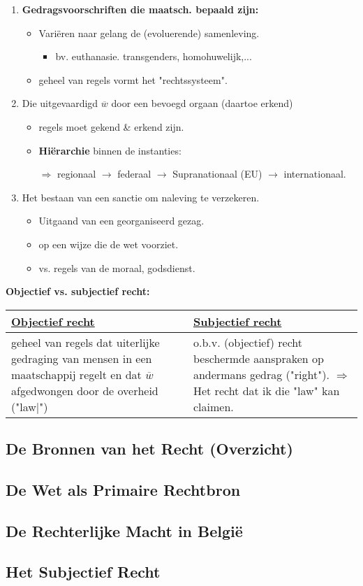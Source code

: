 \begin{enumerate}
	\item \textbf{Gedragsvoorschriften die maatsch. bepaald zijn:}
	\begin{itemize}
		\item Vari\"eren naar gelang de (evoluerende) samenleving.
		\begin{itemize}
			\item bv. euthanasie. transgenders, homohuwelijk,...
		\end{itemize}
		\item geheel van regels vormt het "rechtssysteem".
	\end{itemize}
	\item Die uitgevaardigd $\overline{w}$ door een bevoegd orgaan (daartoe erkend)
	\begin{itemize}
		\item regels moet gekend \& erkend zijn.
		\item \textbf{Hi\"erarchie} binnen de instanties:
		\item[$\Rightarrow$] regionaal $\rightarrow$ federaal  $\rightarrow$ Supranationaal (EU)  $\rightarrow$ internationaal.
		\end{itemize}
	\item Het bestaan van een sanctie om naleving te verzekeren.
	\begin{itemize}
		\item Uitgaand van een georganiseerd gezag.
		\item op een wijze die de wet voorziet.
		\item vs. regels van de moraal, godsdienst.
	\end{itemize}
\end{enumerate}

\textbf{Objectief vs. subjectief recht:}

\begin{tabular}{|p{} | p{} |}
	\hline \textbf{\underline{Objectief recht}} & \textbf{\underline{Subjectief recht}} \\
	\hline geheel van regels dat uiterlijke gedraging van mensen in een maatschappij regelt en dat $\overline{w}$ afgedwongen door de overheid ("law|") & o.b.v. (objectief) recht beschermde aanspraken op andermans gedrag ("right"). $\Rightarrow$ Het recht dat ik die "law" kan claimen.\\ \hline
\end{tabular}

\subsection*{De Bronnen van het Recht (Overzicht)}

\subsection*{De Wet als Primaire Rechtbron}

\subsection*{De Rechterlijke Macht in Belgi\"e}

\subsection*{Het Subjectief Recht}

